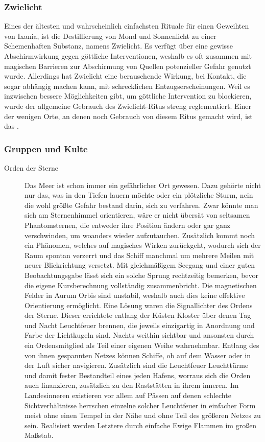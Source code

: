 \documentclass[a4paper,12pt,oneside]{book}
\begin{document}
\subsubsection{Zwielicht}\label{Zwielicht}
Eines der ältesten und wahrscheinlich einfachsten Rituale für einen Geweihten von Ixania, ist die Destillierung von Mond und Sonnenlicht zu einer Schemenhaften Substanz, namens Zwielicht. Es verfügt über eine gewisse Abschirmwirkung gegen göttliche Interventionen, weshalb es oft zusammen mit magischen Barrieren zur Abschirmung von Quellen potenzieller Gefahr genutzt wurde. Allerdings hat Zwielicht eine berauschende Wirkung, bei Kontakt, die sogar abhängig machen kann, mit schrecklichen Entzugserscheinungen. Weil es inzwischen bessere Möglichkeiten gibt, um göttliche Intervention zu blockieren, wurde der allgemeine Gebrauch des Zwielicht-Ritus streng reglementiert. Einer der wenigen Orte, an denen noch Gebrauch von diesem Ritus gemacht wird, ist das \uline{}.
\subsubsection{Gruppen und Kulte}
\begin{description}
\item[Orden der Sterne]Das Meer ist schon immer ein gefährlicher Ort gewesen. Dazu gehörte nicht nur das, was in den Tiefen lauern möchte oder ein plötzliche Sturm, nein die wohl größte Gefahr bestand darin, sich zu verfahren. Zwar könnte man sich am Sternenhimmel orientieren, wäre er nicht übersät von seltsamen Phantomsternen, die entweder ihre Position ändern oder gar ganz verschwinden, um woanders wieder aufzutauchen. Zusätzlich kommt noch ein Phänomen, welches auf magisches Wirken zurückgeht, wodurch sich der Raum spontan verzerrt und das Schiff manchmal um mehrere Meilen mit neuer Blickrichtung versetzt. Mit gleichmäßigem Seegang und einer guten Beobachtungsgabe lässt sich ein solche Sprung rechtzeitig bemerken, bevor die eigene Kursberechnung vollständig zusammenbricht. Die magnetischen Felder in Aurum Orbis sind unstabil, weshalb auch dies keine effektive Orientierung ermöglicht. Eine Lösung waren die Signallichter des Ordens der Sterne. Dieser errichtete entlang der Küsten Kloster über denen Tag und Nacht Leuchtfeuer brennen, die jeweils einzigartig in Anordnung und Farbe der Lichtkugeln sind. Nachts weithin sichtbar und ansonsten durch ein Ordensmitglied als Teil einer eigenen Weihe wahrnehmbar. Entlang des von ihnen gespannten Netzes können Schiffe, ob auf dem Wasser oder in der Luft sicher navigieren. Zusätzlich sind die Leuchtfeuer Leuchttürme und damit fester Bestandteil eines jeden Hafens, worraus sich die Orden auch finanzieren, zusätzlich zu den Raststätten in ihrem inneren. Im Landesinneren existieren vor allem auf Pässen auf denen schlechte Sichtverhältnisse herrschen einzelne solcher Leuchtfeuer in einfacher Form meist ohne einen Tempel in der Nähe und ohne Teil des größeren Netzes zu sein. Realisiert werden Letztere durch einfache Ewige Flammen im großen Maßstab.
\end{description}
\end{document}
